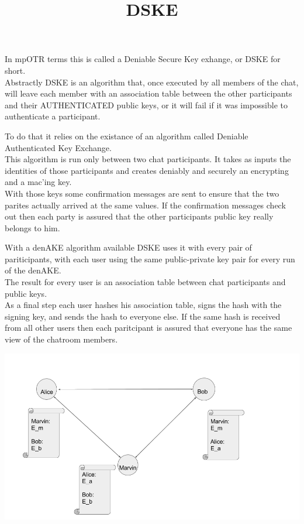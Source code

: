 \documentclass{beamer}
\begin{document}
\begin{frame}
\title{DSKE}
In mpOTR terms this is called a Deniable Secure Key exhange, or DSKE for short.\\[0.5cm]

Abstractly DSKE is an algorithm that, once executed by all members of the chat, will leave each member with an association table between the other participants and their AUTHENTICATED public keys, or it will fail if it was impossible to authenticate a participant.
\end{frame}

\begin{frame}
To do that it relies on the existance of an algorithm called Deniable Authenticated Key Exchange.\\[0.5cm]

This algorithm is run only between two chat participants. It takes as inputs the identities of those participants and creates deniably and securely an encrypting and a mac'ing key.\\[0.5cm]

With those keys some confirmation messages are sent to ensure that the two parites actually arrived at the same values. If the confirmation messages check out then each party is assured that the other participants public key really belongs to him.
\end{frame}

\begin{frame}
With a denAKE algorithm available DSKE uses it with every pair of pariticipants, with each user using the same public-private key pair for every run of the denAKE.\\[0.5cm]

The result for every user is an association table between chat participants and public keys.\\[0.5cm]

As a final step each user hashes his association table, signs the hash with the signing key, and sends the hash to everyone else. If the same hash is received from all other users then each paritcipant is assured that everyone has the same view of the chatroom members.
\end{frame}

\begin{frame}
\includegraphics[scale=0.4]{denAKE.png}
\end{frame}
\end{document}
